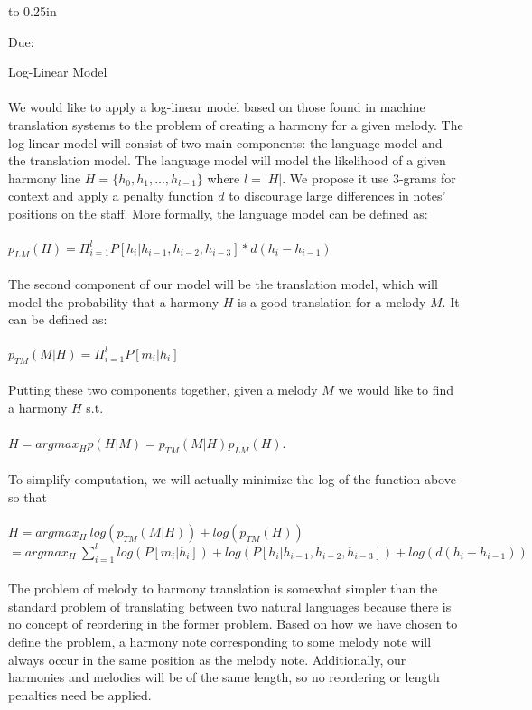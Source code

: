 \documentclass[letterpaper,12pt]{article}
\newcommand{\htitle}
{
    \vbox to 0.25in{}
    \noindent\parbox{\textwidth}
    {
        \student\hfill \assigndate\newline
        \coursename\hfill 
        Due: \duedate \vspace*{-.5ex}\newline
        \mbox{}\hrulefill\mbox{}
    }
    \vspace{8pt}
    \begin{center}{\Large\bf{\settitle}}\end{center}
}
\newcommand{\handout}
{
    \thispagestyle{empty}
    \markboth{}{}
    \pagestyle{plain}
    \htitle
}
\begin{document}
\handout
\setlength{\parindent}{0pt}

Log-Linear Model\\
\\
We would like to apply a log-linear model based on those found in machine translation systems to the problem of creating a harmony for a given melody. The log-linear model will consist of two main components: the language model and the translation model. The language model will model the likelihood of a  given harmony line $H = \{h_{0}, h_{1}, ... , h_{l - 1}\}$ where $l = |H|$. We propose it use 3-grams for context and apply a penalty function $d$ to discourage large differences in notes' positions on the staff. More formally, the language model can be defined as:\\
\\
$p_{LM}(H) = \Pi_{i = 1}^{l} P[h_{i} | h_{i - 1}, h_{i - 2}, h_{i - 3}]*d(h_{i} - h_{i - 1})$\\
\\
The second component of our model will be the translation model, which will model the probability that a harmony $H$ is a good translation for a melody $M$. It can be defined as:\\
\\
$p_{TM}(M | H) = \Pi_{i = 1}^{l} P[m_{i} | h_{i}]$\\
\\
Putting these two components together, given a melody $M$ we would like to find a harmony $H$ s.t.\\
\\
$H = argmax_{H}p(H | M) = p_{TM}(M | H)p_{LM}(H)$.\\
\\
To simplify computation, we will actually minimize the log of the function above so that\\
\\
$H = argmax_{H}\ log(p_{TM}(M | H)) + log(p_{TM}(H))$\\
$= argmax_{H}\ \sum_{i = 1}^{l} log(P[m_{i} | h_{i}]) + log(P[h_{i} | h_{i - 1}, h_{i - 2}, h_{i - 3}]) + log(d(h_{i} - h_{i - 1}))$\\
\\
The problem of melody to harmony translation is somewhat simpler than the standard problem of translating between two natural languages because there is no concept of reordering in the former problem. Based on how we have chosen to define the problem, a harmony note corresponding to some melody note will always occur in the same position as the melody note. Additionally, our harmonies and melodies will be of the same length, so no reordering or length penalties need be applied.\\
\end{document}
